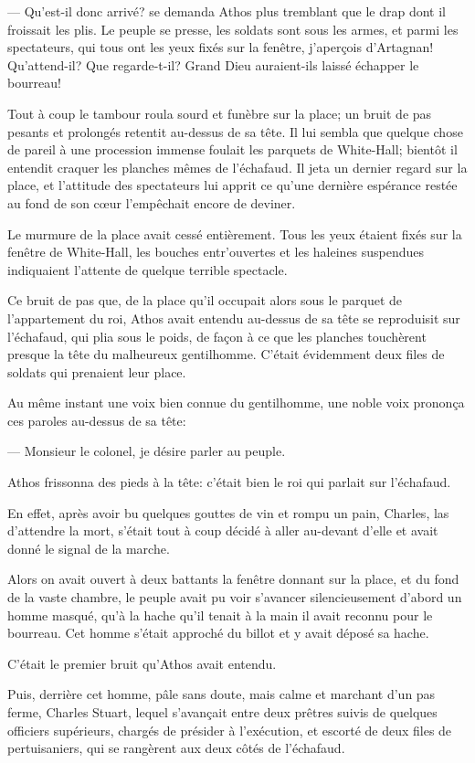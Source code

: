 — Qu'est-il donc arrivé? se demanda Athos plus tremblant que le drap dont il froissait les plis. Le peuple se presse, les soldats sont sous les armes, et parmi les spectateurs, qui tous ont les yeux fixés sur la fenêtre, j'aperçois d'Artagnan! Qu'attend-il? Que regarde-t-il? Grand Dieu auraient-ils laissé échapper le bourreau!

Tout à coup le tambour roula sourd et funèbre sur la place; un bruit de pas pesants et prolongés retentit au-dessus de sa tête. Il lui sembla que quelque chose de pareil à une procession immense foulait les parquets de White-Hall; bientôt il entendit craquer les planches mêmes de l'échafaud. Il jeta un dernier regard sur la place, et l'attitude des spectateurs lui apprit ce qu'une dernière espérance restée au fond de son cœur l'empêchait encore de deviner.

Le murmure de la place avait cessé entièrement. Tous les yeux étaient fixés sur la fenêtre de White-Hall, les bouches entr'ouvertes et les haleines suspendues indiquaient l'attente de quelque terrible spectacle.

Ce bruit de pas que, de la place qu'il occupait alors sous le parquet de l'appartement du roi, Athos avait entendu au-dessus de sa tête se reproduisit sur l'échafaud, qui plia sous le poids, de façon à ce que les planches touchèrent presque la tête du malheureux gentilhomme. C'était évidemment deux files de soldats qui prenaient leur place.

Au même instant une voix bien connue du gentilhomme, une noble voix prononça ces paroles au-dessus de sa tête:

— Monsieur le colonel, je désire parler au peuple.

Athos frissonna des pieds à la tête: c'était bien le roi qui parlait sur l'échafaud.

En effet, après avoir bu quelques gouttes de vin et rompu un pain, Charles, las d'attendre la mort, s'était tout à coup décidé à aller au-devant d'elle et avait donné le signal de la marche.

Alors on avait ouvert à deux battants la fenêtre donnant sur la place, et du fond de la vaste chambre, le peuple avait pu voir s'avancer silencieusement d'abord un homme masqué, qu'à la hache qu'il tenait à la main il avait reconnu pour le bourreau. Cet homme s'était approché du billot et y avait déposé sa hache.

C'était le premier bruit qu'Athos avait entendu.

Puis, derrière cet homme, pâle sans doute, mais calme et marchant d'un pas ferme, Charles Stuart, lequel s'avançait entre deux prêtres suivis de quelques officiers supérieurs, chargés de présider à l'exécution, et escorté de deux files de pertuisaniers, qui se rangèrent aux deux côtés de l'échafaud.

